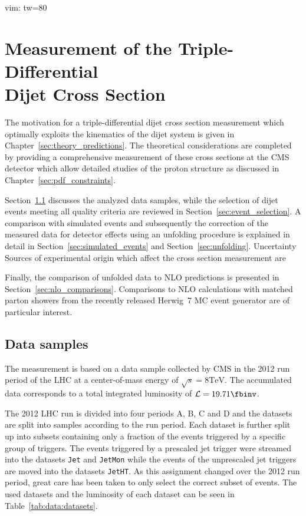  vim: tw=80

\chapter[Measurement of the Triple-Differential Dijet Cross Section]{Measurement
of the Triple-Differential\\ Dijet Cross Section}
\label{sec:measurement}

The motivation for a triple-differential dijet cross section measurement which
optimally exploits the kinematics of the dijet system is given in
Chapter~\ref{sec:theory_predictions}. The theoretical considerations are completed
by providing a comprehensive measurement of these cross sections at the CMS
detector which allow detailed studies of the proton structure as discussed in
Chapter~\ref{sec:pdf_constraints}. 

Section~\ref{sec:datasets} discusses the
analyzed data samples, while the selection of dijet events meeting all quality
criteria are reviewed in Section~\ref{sec:event_selection}. A comparison with
simulated events and subsequently the correction of the measured data for
detector effects using an unfolding procedure is explained in detail in
Section~\ref{sec:simulated_events} and Section~\ref{sec:unfolding}. Uncertainty
Sources of experimental origin which affect the cross section measurement are

Finally, the comparison of unfolded data to NLO predictions is presented in
Section~\ref{sec:nlo_comparisons}. Comparisons to NLO calculations with matched
parton showers from the recently released Herwig~7 MC event generator are of
particular interest.

\section{Data samples}
\label{sec:datasets}

The measurement is based on a data sample collected by CMS in the 2012 run
period of the LHC at a center-of-mass energy of $\sqrt{s} = 8 \si{\TeV}$. The
accumulated data corresponds to a total integrated luminosity of $\mathcal{L} =
19.71 \si{\fbinv}$. 

The 2012 LHC run is divided into four periods A, B, C and D and the datasets are
split into samples according to the run period. Each dataset is further split up
into subsets containing only a fraction of the events triggered by a specific
group of triggers. The events triggered by a prescaled jet trigger were streamed
into the datasets \texttt{Jet} and \texttt{JetMon} while the events of the
unprescaled jet triggers are moved into the datasets \texttt{JetHT}. As this
assignment changed over the 2012 run period, great care has been taken to only
select the correct subset of events. The used datasets and the luminosity of
each dataset can be seen in Table~\ref{tab:data:datasets}.


